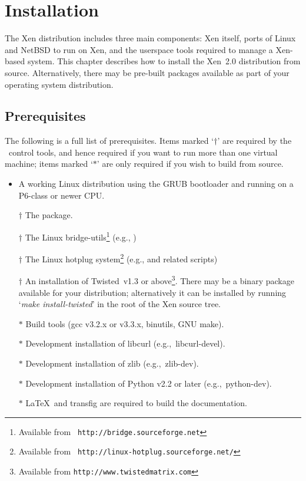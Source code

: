 \chapter{Installation}

The Xen distribution includes three main components: Xen itself, ports
of Linux and NetBSD to run on Xen, and the userspace
tools required to manage a Xen-based system.  This chapter describes
how to install the Xen~2.0 distribution from source.  Alternatively,
there may be pre-built packages available as part of your operating
system distribution.


\section{Prerequisites}
\label{sec:prerequisites}

The following is a full list of prerequisites.  Items marked `$\dag$'
are required by the \xend\ control tools, and hence required if you
want to run more than one virtual machine; items marked `$*$' are only
required if you wish to build from source.
\begin{itemize}
\item A working Linux distribution using the GRUB bootloader and
  running on a P6-class or newer CPU\@.
\item [$\dag$] The  package.
\item [$\dag$] The Linux bridge-utils\footnote{Available from {\tt
      http://bridge.sourceforge.net}} (e.g., )
\item [$\dag$] The Linux hotplug system\footnote{Available from {\tt
      http://linux-hotplug.sourceforge.net/}} (e.g., 
      and related scripts)
\item [$\dag$] An installation of Twisted~v1.3 or
  above\footnote{Available from {\tt http://www.twistedmatrix.com}}.
  There may be a binary package available for your distribution;
  alternatively it can be installed by running `{\sl make
    install-twisted}' in the root of the Xen source tree.
\item [$*$] Build tools (gcc v3.2.x or v3.3.x, binutils, GNU make).
\item [$*$] Development installation of libcurl (e.g.,\ libcurl-devel).
\item [$*$] Development installation of zlib (e.g.,\ zlib-dev).
\item [$*$] Development installation of Python v2.2 or later (e.g.,\ 
  python-dev).
\item [$*$] \LaTeX\ and transfig are required to build the
  documentation.
\end{itemize}

